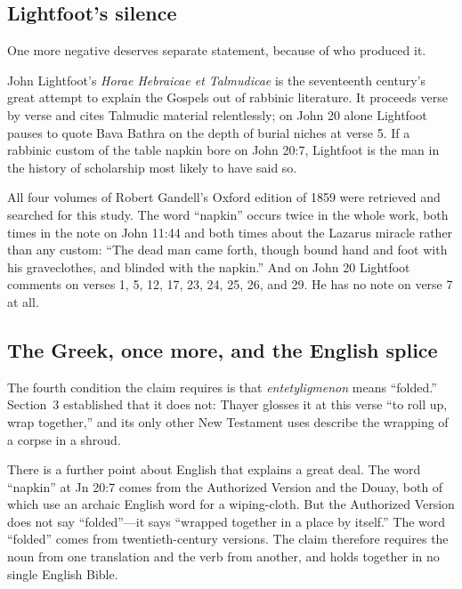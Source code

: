 \subsection{Lightfoot's silence}

One more negative deserves separate statement, because of who produced it.

John Lightfoot's \emph{Horae Hebraicae et Talmudicae} is the seventeenth
century's great attempt to explain the Gospels out of rabbinic literature. It
proceeds verse by verse and cites Talmudic material relentlessly; on John 20
alone Lightfoot pauses to quote Bava Bathra on the depth of burial niches at
verse 5. If a rabbinic custom of the table napkin bore on John 20:7, Lightfoot
is the man in the history of scholarship most likely to have said so.

All four volumes of Robert Gandell's Oxford edition of 1859 were retrieved and
searched for this study. The word ``napkin'' occurs twice in the whole work,
both times in the note on John 11:44 and both times about the Lazarus miracle
rather than any custom: ``The dead man came forth, though bound hand and foot
with his graveclothes, and blinded with the napkin.'' And on John 20 Lightfoot
comments on verses 1, 5, 12, 17, 23, 24, 25, 26, and 29. He has no note on
verse 7 at all.

\subsection{The Greek, once more, and the English splice}

The fourth condition the claim requires is that \emph{entetyligmenon} means
``folded.'' Section~3 established that it does not: Thayer glosses it at this
verse ``to roll up, wrap together,'' and its only other New Testament uses
describe the wrapping of a corpse in a shroud.

There is a further point about English that explains a great deal. The word
``napkin'' at Jn 20:7 comes from the Authorized Version and the Douay, both of
which use an archaic English word for a wiping-cloth. But the Authorized
Version does not say ``folded''---it says ``wrapped together in a place by
itself.'' The word ``folded'' comes from twentieth-century versions. The claim
therefore requires the noun from one translation and the verb from another, and
holds together in no single English Bible.

